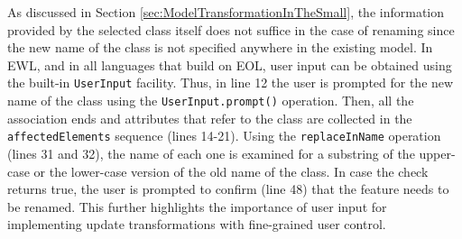 As discussed in Section \ref{sec:ModelTransformationInTheSmall}, the information provided by the selected class itself does not suffice in the case of renaming since the new name of the class is not specified anywhere in the existing model. In EWL, and in all languages that build on EOL, user input can be obtained using the built-in \texttt{UserInput} facility. Thus, in line 12 the user is prompted for the new name of the class using the \texttt{UserInput.prompt()} operation. Then, all the association ends and attributes that refer to the class are collected in the \texttt{affectedElements} sequence (lines 14-21). Using the \texttt{replaceInName} operation (lines 31 and 32), the name of each one is examined for a substring of the upper-case or the lower-case version of the old name of the class. In case the check returns true, the user is prompted to confirm (line 48) that the feature needs to be renamed. This further highlights the importance of user input for implementing update transformations with fine-grained user control. 